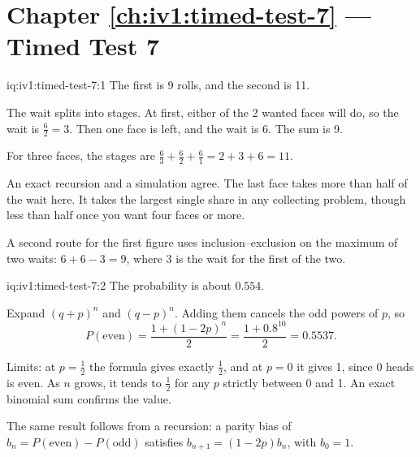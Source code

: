 \section*{Chapter \ref{ch:iv1:timed-test-7} --- Timed Test 7}

\begin{solution}{iq:iv1:timed-test-7:1}
The first is 9 rolls, and the second is 11.

The wait splits into stages. At first, either of the 2 wanted faces will do, so the wait is $\frac62 = 3$. Then one face is left, and the wait is 6. The sum is 9.

For three faces, the stages are $\frac63 + \frac62 + \frac61 = 2 + 3 + 6 = 11$.

An exact recursion and a simulation agree. The last face takes more than half of the wait here. It takes the largest single share in any collecting problem, though less than half once you want four faces or more.

A second route for the first figure uses inclusion--exclusion on the maximum of two waits: $6 + 6 - 3 = 9$, where 3 is the wait for the first of the two.

\end{solution}

\begin{solution}{iq:iv1:timed-test-7:2}
The probability is about $0.554$.

Expand $(q + p)^n$ and $(q - p)^n$. Adding them cancels the odd powers of $p$, so
\[
P(\text{even}) = \frac{1 + (1 - 2p)^n}{2} = \frac{1 + 0.8^{10}}{2} = 0.5537.
\]

Limits: at $p = \frac12$ the formula gives exactly $\frac12$, and at $p = 0$ it gives 1, since 0 heads is even. As $n$ grows, it tends to $\frac12$ for any $p$ strictly between 0 and 1. An exact binomial sum confirms the value.

The same result follows from a recursion: a parity bias of $b_n = P(\text{even}) - P(\text{odd})$ satisfies $b_{n + 1} = (1 - 2p)b_n$, with $b_0 = 1$.

\end{solution}

